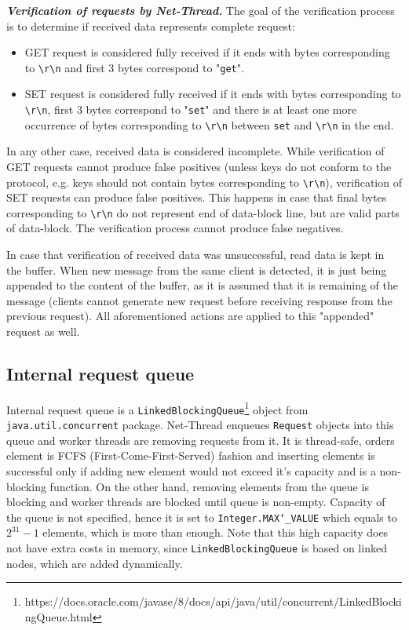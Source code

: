 \documentclass[11pt,a4paper]{article}
\begin{document}
\textit{\textbf{Verification of requests by Net-Thread.}} The goal of the verification process is to determine if received data represents complete request:
\begin{itemize}
	\item GET request is considered fully received if it ends with bytes corresponding to \texttt{\textbackslash r\textbackslash n} and first 3 bytes correspond to "\texttt{get}".
	\item SET request is considered fully received if it ends with bytes corresponding to \texttt{\textbackslash r\textbackslash n}, first 3 bytes correspond to "\texttt{set}" and there is at least one more occurrence of bytes corresponding to \texttt{\textbackslash r\textbackslash n} between \texttt{set} and \texttt{\textbackslash r\textbackslash n} in the end.
\end{itemize}
In any other case, received data is considered incomplete. While verification of GET requests cannot produce false positives (unless keys do not conform to the protocol, e.g. keys should not contain bytes corresponding to \texttt{\textbackslash r\textbackslash n}), verification of SET requests can produce false positives. This happens in case that final bytes corresponding to \texttt{\textbackslash r\textbackslash n} do not represent end of data-block line, but are valid parts of data-block. The verification process cannot produce false negatives.

In case that verification of received data was unsuccessful, read data is kept in the buffer. When new message from the same client is detected, it is just being appended to the content of the buffer, as it is assumed that it is remaining of the message (clients cannot generate new request before receiving response from the previous request). All aforementioned actions are applied to this "appended" request as well. 

\subsection{Internal request queue}

Internal request queue is a \texttt{LinkedBlockingQueue}\footnote{https://docs.oracle.com/javase/8/docs/api/java/util/concurrent/LinkedBlockingQueue.html} object from \texttt{java.util.concurrent} package. Net-Thread enqueues \texttt{Request} objects into this queue and worker threads are removing requests from it. It is thread-safe, orders element is FCFS (First-Come-First-Served) fashion and inserting elements is successful only if adding new element would not exceed it's capacity and is a non-blocking function. On the other hand, removing elements from the queue is blocking and worker threads are blocked until queue is non-empty. Capacity of the queue is not specified, hence it is set to \texttt{Integer.MAX\char`_VALUE} which equals to $2^{31} - 1$ elements, which is more than enough. Note that this high capacity does not have extra costs in memory, since \texttt{LinkedBlockingQueue} is based on linked nodes, which are added dynamically.
\end{document}
